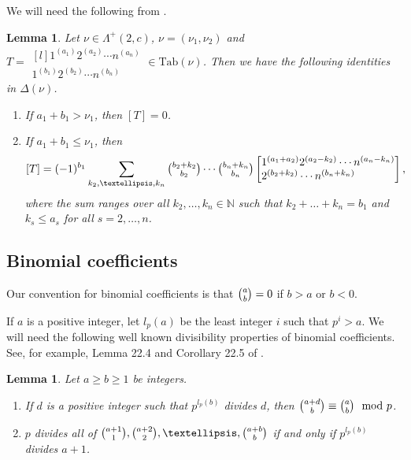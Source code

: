 \documentclass[11pt]{article}
\newtheorem{lemma}[theo]{Lemma}
\theoremstyle{definition}
\numberwithin{equation}{section}
\newcommand{\La}{\Lambda}
\numberwithin{equation}{section}
\begin{document}
We will need the following from \cite[Lemma 4.2]{MS3}.
\begin{lemma}\label{lem15}Let $\nu \in \La^+(2,c)$, $\nu=(\nu_1,\nu_2)$ and $T=\begin{matrix*}[l]
		1^{(a_1)}2^{(a_2)}  \cdots   n^{(a_n)} \\
		1^{(b_1)}2^{(b_2)}  \cdots  n^{(b_n)}
	\end{matrix*} \in \mathrm{Tab} (\nu)$.
	Then we have the following identities in $\Delta{(\nu)}$.
	\begin{enumerate}
		\item If $a_1+b_1>\nu_1$, then $[T]=0$.
		\item If $a_1+b_1 \le \nu_1$, then 
		\[[T]=(-1)^{b_1}\sum_{k_2,\dots,k_n}\tbinom{b_2+k_2}{b_2}\cdots\tbinom{b_n+k_n}{b_n}
		\begin{bmatrix*}[l]
			1^{(a_1+a_2)}2^{(a_2-k_2)}  \cdots   n^{(a_n-k_n)} \\
			2^{(b_2+k_2)}  \cdots  n^{(b_n+k_n)}
		\end{bmatrix*},
		\] where the sum ranges over all  $k_2,\dots,k_n \in \mathbb{N}$
		such that  $k_2+\dots+k_n=b_1 $ and $k_s \le a_s$ for all $s=2,\dots,n$.	\end{enumerate}	
\end{lemma}

\subsection{Binomial coefficients}\label{s2.5}
Our convention for binomial coefficients is that $\tbinom{a}{b}=0$ if $b>a$ or $b<0$.

If $a$ is a positive integer, let $l_p(a)$ be the least integer $i$ such that $p^i>a$. We will need the following well known divisibility properties of binomial coefficients. See, for example, Lemma 22.4 and Corollary 22.5 of \cite{Jam}.
\begin{lemma}\label{bin1}
	Let $a \ge b \ge 1$ be integers. \begin{enumerate}
		\item If $d$ is a positive integer such that $ p^{l_p(b)}$ divides $d$, then $\tbinom{a+d}{b} \equiv \tbinom{a}{b} \mod p $.
		\item $p$ divides all of $\tbinom{a+1}{1}, \tbinom{a+2}{2}, \dots, \tbinom{a+b}{b}$ if and only if $p^{l_{p}(b)}$ divides $a+1$.
	\end{enumerate}
\end{lemma}
\end{document}
